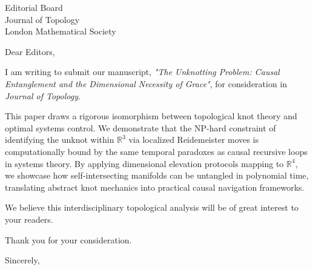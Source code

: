 \documentclass[11pt]{letter}
\begin{document}
\begin{letter}{Editorial Board \\ Journal of Topology \\ London Mathematical Society}
\opening{Dear Editors,}

I am writing to submit our manuscript, \textit{"The Unknotting Problem: Causal Entanglement and the Dimensional Necessity of Grace"}, for consideration in \textit{Journal of Topology}. 

This paper draws a rigorous isomorphism between topological knot theory and optimal systems control. We demonstrate that the NP-hard constraint of identifying the unknot within $\mathbb{R}^3$ via localized Reidemeister moves is computationally bound by the same temporal paradoxes as causal recursive loops in systems theory. By applying dimensional elevation protocols mapping to $\mathbb{R}^4$, we showcase how self-intersecting manifolds can be untangled in polynomial time, translating abstract knot mechanics into practical causal navigation frameworks.

We believe this interdisciplinary topological analysis will be of great interest to your readers.

Thank you for your consideration.

\closing{Sincerely,}

\end{letter}
\end{document}
